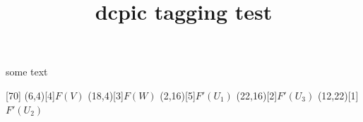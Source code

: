 \documentclass{article}
\title{dcpic tagging test}
\begin{document}
some text

\begindc{\commdiag}[70]
\obj(6,4)[4]{$F(V)$}
\obj(18,4)[3]{$F(W)$}
\obj(2,16)[5]{$F'(U_1)$}
\obj(22,16)[2]{$F'(U_3)$}
\obj(12,22)[1]{$F'(U_2)$}
\enddc
\end{document}
